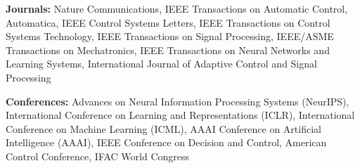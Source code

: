 \documentclass[10pt, letterpaper]{article}
\begin{document}
\textbf{Journals:} Nature Communications, IEEE Transactions on Automatic Control, Automatica, IEEE Control Systems Letters, IEEE Transactions on Control Systems Technology, IEEE Transactions on Signal Processing, IEEE/ASME Transactions on Mechatronics, IEEE Transactions on Neural Networks and Learning Systems, International Journal of Adaptive Control and Signal Processing

\textbf{Conferences:} Advances on Neural Information Processing Systems (NeurIPS), International Conference on Learning and Representations (ICLR), International Conference on Machine Learning (ICML), AAAI Conference on Artificial Intelligence (AAAI), IEEE Conference on Decision and Control, American Control Conference, IFAC World Congress

    

    
\end{document}
